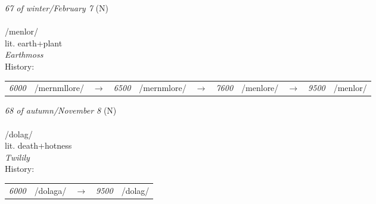 \vspace{15pt}
\begin{nopagebreak}
 \textit{67 of winter/February 7} (N)\\
\\
\noindent /m{\textprimstress}enlor/\\
\noindent lit. earth+plant\\
\noindent \textit{Earthmoss}\\


\noindent History:

\vspace{-0pt}
\hspace{40pt}
\begin{tabular}{ccc}
\textit{6000} & /mernmllore/&$\rightarrow$ & \textit{6500} & /mernmlore/&$\rightarrow$ & \textit{7600} & /menlore/&$\rightarrow$ & \textit{9500} & /menlor/& \\
\end{tabular}

\vspace{20pt}\hline

\end{nopagebreak}
\filbreak



\vspace{15pt}
\begin{nopagebreak}
 \textit{68 of autumn/November 8} (N)\\
\\
\noindent /d{\textprimstress}olag/\\
\noindent lit. death+hotness\\
\noindent \textit{Twilily}\\


\noindent History:

\vspace{-0pt}
\hspace{40pt}
\begin{tabular}{ccc}
\textit{6000} & /dolaga/&$\rightarrow$ & \textit{9500} & /dolag/& \\
\end{tabular}

\vspace{20pt}\hline

\end{nopagebreak}
\filbreak



